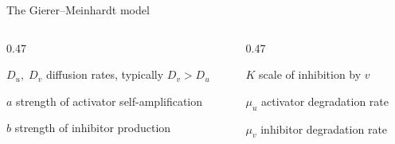 \begin{frame}{The Gierer--Meinhardt model}
{  \begin{columns}[t,onlytextwidth]

    \begin{column}{0.47\textwidth}

      \textcolor{HydraCyan}{$D_u,\;D_v$}
      \quad diffusion rates, typically $D_v>D_u$

      \vspace{0.18cm}

      \textcolor{HydraGold}{$a$}
      \quad strength of activator self-amplification

      \vspace{0.18cm}

      \textcolor{HydraGold}{$b$}
      \quad strength of inhibitor production

    \end{column}

    \begin{column}{0.47\textwidth}

      \textcolor{HydraGold}{$K$}
      \quad scale of inhibition by $v$

      \vspace{0.18cm}

      \textcolor{HydraGold}{$\mu_u$}
      \quad activator degradation rate

      \vspace{0.18cm}

      \textcolor{HydraGold}{$\mu_v$}
      \quad inhibitor degradation rate

    \end{column}

  \end{columns}
  }

\end{frame}

